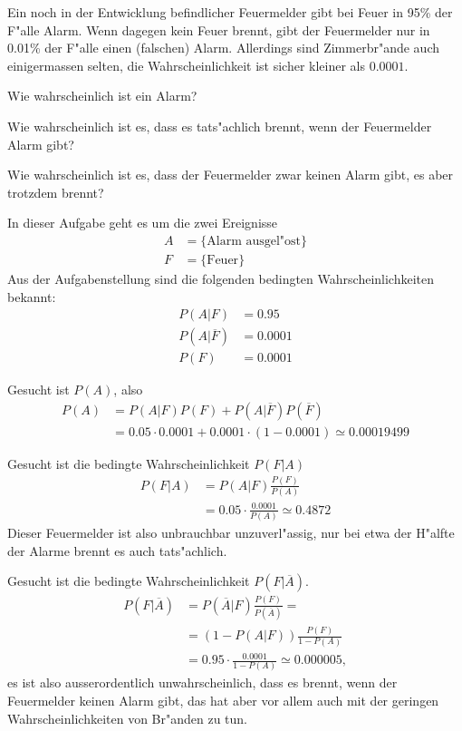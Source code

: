 Ein noch in der Entwicklung befindlicher Feuermelder gibt bei Feuer in 95\%
der F"alle Alarm. Wenn dagegen kein Feuer brennt, gibt der Feuermelder
nur in 0.01\% der F"alle einen (falschen) Alarm. Allerdings sind
Zimmerbr"ande auch einigermassen selten, die Wahrscheinlichkeit
ist sicher kleiner als $0.0001$.

\begin{teilaufgaben}
\item Wie wahrscheinlich ist ein Alarm?
\item Wie wahrscheinlich ist es, dass es tats"achlich brennt, wenn
der Feuermelder Alarm gibt?
\item Wie wahrscheinlich ist es, dass der Feuermelder zwar keinen
Alarm gibt, es aber trotzdem brennt?
\end{teilaufgaben}

\begin{loesung}
In dieser Aufgabe geht es um die zwei Ereignisse
\begin{align*}
A&=\{\text{Alarm ausgel"ost}\}
\\
F&=\{\text{Feuer}\}
\end{align*}
Aus der Aufgabenstellung sind die folgenden bedingten Wahrscheinlichkeiten
bekannt:
\begin{align*}
P(A|F)&=0.95
\\
P(A|\overline F)&=0.0001
\\
P(F)&=0.0001
\end{align*}
\begin{teilaufgaben}
\item Gesucht ist $P(A)$, also
\begin{align*}
P(A)&=P(A|F)P(F)+P(A|\overline F)P(\overline F)
\\
&=0.05\cdot 0.0001+0.0001\cdot(1-0.0001)\simeq 0.00019499
\end{align*}
\item
Gesucht ist die bedingte Wahrscheinlichkeit $P(F|A)$
\begin{align*}
P(F|A)
&=
P(A|F) \frac{P(F)}{P(A)}
\\
&=0.05\cdot\frac{0.0001}{P(A)}\simeq0.4872
\end{align*}
Dieser Feuermelder ist also unbrauchbar unzuverl"assig, nur bei etwa der
H"alfte der Alarme brennt es auch tats"achlich.
\item Gesucht ist die bedingte Wahrscheinlichkeit $P(F|\overline A)$.
\begin{align*}
P(F|\overline A)
&=
P(\overline A|F)\frac{P(F)}{P(\overline A)}=
\\
&=
(1-P(A|F))\frac{P(F)}{1-P(A)}
\\
&=
0.95\cdot \frac{0.0001}{1-P(A)}\simeq0.000005,
\end{align*}
es ist also ausserordentlich unwahrscheinlich, dass es brennt,
wenn der Feuermelder keinen Alarm gibt, das hat aber vor allem auch
mit der geringen Wahrscheinlichkeiten von Br"anden zu tun.
\end{teilaufgaben}
\end{loesung}

